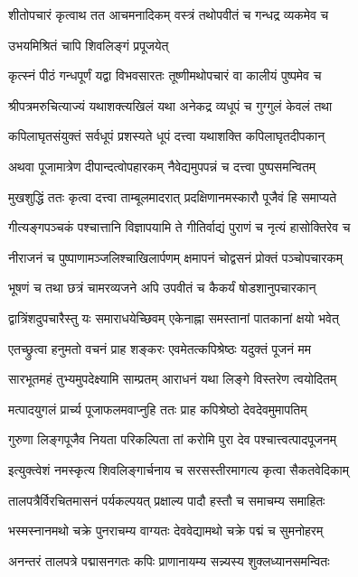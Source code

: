 \twolineshloka
{शीतोपचारं कृत्वाथ तत आचमनादिकम्}
{वस्त्रं तथोपवीतं च गन्धद्र व्यकमेव च}%


{उभयमिश्रितं चापि शिवलिङ्गं प्रपूजयेत्}

\twolineshloka
{कृत्स्नं पीठं गन्धपूर्णं यद्वा विभवसारतः}
{तूष्णीमथोपचारं वा कालीयं पुष्पमेव च}%

\twolineshloka
{श्रीपत्रमरुचित्याज्यं यथाशक्त्यखिलं यथा}
{अनेकद्र व्यधूपं च गुग्गुलं केवलं तथा}%

\twolineshloka
{कपिलाघृतसंयुक्तं सर्वधूपं प्रशस्यते}
{धूपं दत्त्वा यथाशक्ति कपिलाघृतदीपकान्}%

\twolineshloka
{अथवा पूजामात्रेण दीपान्दत्वोपहारकम्}
{नैवेद्यमुपपन्नं च दत्त्वा पुष्पसमन्वितम्}%

\twolineshloka
{मुखशुद्धिं ततः कृत्वा दत्त्वा ताम्बूलमादरात्}
{प्रदक्षिणानमस्कारौ पूजैवं हि समाप्यते}%

\twolineshloka
{गीत्यङ्गपञ्चकं पश्चात्तानि विज्ञापयामि ते}
{गीतिर्वाद्यं पुराणं च नृत्यं हासोक्तिरेव च}%

\twolineshloka
{नीराजनं च पुष्पाणामञ्जलिश्चाखिलार्पणम्}
{क्षमापनं चोद्वसनं प्रोक्तं पञ्चोपचारकम्}%

\twolineshloka
{भूषणं च तथा छत्रं चामरव्यजने अपि}
{उपवीतं च कैकर्यं षोडशानुपचारकान्}%

\twolineshloka
{द्वात्रिंशदुपचारैस्तु यः समाराधयेच्छिवम्}
{एकेनाह्ना समस्तानां पातकानां क्षयो भवेत्}%

\twolineshloka
{एतच्छ्रुत्वा हनुमतो वचनं प्राह शङ्करः}
{एवमेतत्कपिश्रेष्ठः यदुक्तं पूजनं मम}%

\twolineshloka
{सारभूतमहं तुभ्यमुपदेक्ष्यामि साम्प्रतम्}
{आराधनं यथा लिङ्गे विस्तरेण त्वयोदितम्}%

\twolineshloka
{मत्पादयुगलं प्रार्च्य पूजाफलमवाप्नुहि}
{ततः प्राह कपिश्रेष्ठो देवदेवमुमापतिम्}%

\twolineshloka
{गुरुणा लिङ्गपूजैव नियता परिकल्पिता}
{तां करोमि पुरा देव पश्चात्त्वत्पादपूजनम्}%

\twolineshloka
{इत्युक्त्वेशं नमस्कृत्य शिवलिङ्गार्चनाय च}
{सरसस्तीरमागत्य कृत्वा सैकतवेदिकाम्}%

\twolineshloka
{तालपत्रैर्विरचितमासनं पर्यकल्पयत्}
{प्रक्षाल्य पादौ हस्तौ च समाचम्य समाहितः}%

\twolineshloka
{भस्मस्नानमथो चक्रे पुनराचम्य वाग्यतः}
{देववेद्यामथो चक्रे पद्मं च सुमनोहरम्}%

\twolineshloka
{अनन्तरं तालपत्रे पद्मासनगतः कपिः}
{प्राणानायम्य सन्न्यस्य शुक्लध्यानसमन्वितः}%

